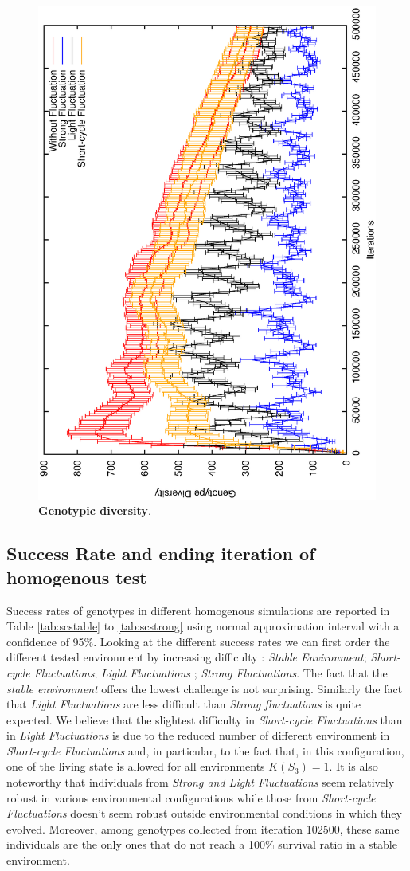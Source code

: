 \begin{figure}[h]
\centering
\includegraphics[width=0.7\columnwidth, angle =-90 ]{img/GenoDiversity}
\caption{\textbf{Genotypic diversity}.}
\label{fig:genodiv}
\end{figure}

\subsection{Success Rate and ending iteration of homogenous test}
Success rates of genotypes in different homogenous simulations are reported in Table \ref{tab:scstable} to \ref{tab:scstrong} using normal approximation interval with a confidence of 95\%. Looking at the different success rates we can first order the different tested environment by increasing difficulty : \emph{Stable Environment}; \emph{Short-cycle Fluctuations}; \emph{Light Fluctuations} ; \emph{Strong Fluctuations}. The fact that the \emph{stable environment} offers the lowest challenge is not surprising. Similarly the fact that \emph{Light Fluctuations} are less difficult than \emph{Strong fluctuations} is quite expected. We believe that the slightest difficulty in \emph{Short-cycle Fluctuations} than in \emph{Light Fluctuations} is due to the reduced number of different environment in \emph{Short-cycle Fluctuations} and, in particular, to the fact that, in this configuration, one of the living state is allowed for all environments $K(S_3)=1$. It is also noteworthy that individuals from \emph{Strong and Light Fluctuations} seem relatively robust in various environmental configurations while those from \emph{Short-cycle Fluctuations} doesn't seem robust outside environmental conditions in which they evolved. Moreover, among genotypes collected from iteration 102500, these same individuals are the only ones that do not reach a 100\% survival ratio in a stable environment.
 


